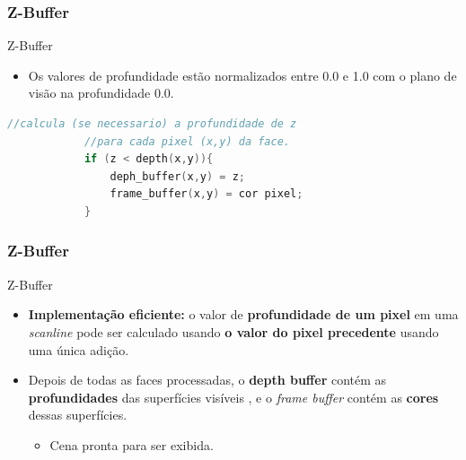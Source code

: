 \documentclass{beamer}
\begin{document}
\begin{frame}[fragile]
\frametitle{Z-Buffer}

		\begin{block}{Z-Buffer}
			\begin{itemize}	
				\item Os valores de profundidade estão normalizados entre 0.0 e 1.0 com o plano de visão na profundidade 0.0.
			\end{itemize}
		\end{block}
		
		\begin{lstlisting}[language=C++]
			//calcula (se necessario) a profundidade de z
			//para cada pixel (x,y) da face.
			if (z < depth(x,y)){
			    deph_buffer(x,y) = z;
			    frame_buffer(x,y) = cor pixel;
			}
		\end{lstlisting}
		
\end{frame}

\begin{frame}[fragile]
\frametitle{Z-Buffer}

		\begin{block}{Z-Buffer}
			\begin{itemize}	
				\item \textbf{Implementação eficiente:} o valor de \textbf{profundidade de um pixel} em uma \textit{scanline} pode ser calculado usando \textbf{o valor do pixel precedente} usando uma única adição.
			\end{itemize}
		\end{block}
		
		\begin{block}{}
			\begin{itemize}		
				\item Depois de todas as faces processadas, o \textbf{depth buffer} contém as \textbf{profundidades} das superfícies visíveis	, e o \textit{frame buffer} contém as \textbf{cores} dessas superfícies.
				\begin{itemize}
					\item Cena pronta para ser exibida.
				\end{itemize}
			\end{itemize}
		\end{block}
		
\end{frame}
\end{document}
